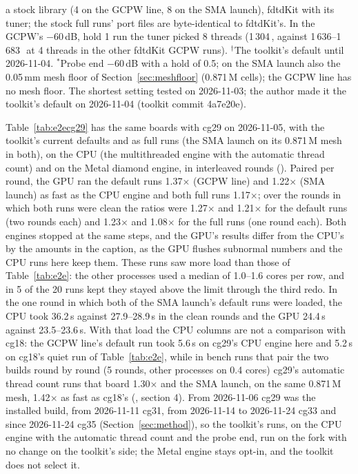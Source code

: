 \begin{table}[H]
{a stock library (4 on the GCPW line, 8 on the SMA launch), fdtdKit with its tuner; the stock full runs' port files are
byte-identical to fdtdKit's. In the GCPW's $-60$\,dB, hold 1 run the tuner picked 8 threads (1\,304\,\MC, against
1\,636--1\,683\,\MC\ at 4 threads in the other fdtdKit GCPW runs). $^{\dagger}$The toolkit's default until
2026-11-04. $^{*}$Probe end $-60$\,dB with a hold of
0.5; on the SMA launch also the 0.05\,mm mesh floor of Section~\ref{sec:meshfloor} (0.871\,M cells); the GCPW line
has no mesh floor. The shortest setting tested on 2026-11-03; the author made it the toolkit's default on 2026-11-04
(toolkit commit 4a7e20e).}\label{tab:e2e}
\end{table}

Table~\ref{tab:e2ecg29} has the same boards with cg29 on 2026-11-05, with the toolkit's current defaults and as full
runs (the SMA launch on its 0.871\,M mesh in both), on the CPU (the multithreaded engine with the automatic thread
count) and on the Metal diamond engine, in interleaved rounds ().
Paired per round, the GPU ran the default runs
1.37$\times$ (GCPW line) and 1.22$\times$ (SMA launch) as fast as the CPU engine and both full runs 1.17$\times$; over
the rounds in which both runs were clean the ratios were 1.27$\times$ and 1.21$\times$ for the default runs (two
rounds each) and 1.23$\times$ and 1.08$\times$ for the full runs (one round each). Both engines stopped at the same
steps, and the GPU's results differ from the CPU's by the amounts in the caption, as the GPU flushes subnormal
numbers and the CPU runs here keep them. These runs saw more load than those of Table~\ref{tab:e2e}: the other
processes used a median of 1.0--1.6 cores per row, and in 5 of the 20 runs kept they stayed above the limit through
the third redo. In the one round in which both of the SMA launch's default runs were loaded, the CPU took 36.2\,s
against 27.9--28.9\,s in the clean rounds and the GPU 24.4\,s against 23.5--23.6\,s. With that load the CPU
columns are not a comparison with cg18: the GCPW line's default run took 5.6\,s on cg29's CPU engine here and 5.2\,s
on cg18's quiet run of Table~\ref{tab:e2e}, while in bench runs that pair the two builds round by round (5 rounds,
other processes on 0.4 cores) cg29's automatic thread count runs that board 1.30$\times$ and the SMA launch, on the
same 0.871\,M mesh, 1.42$\times$ as fast as cg18's (, section 4).
From 2026-11-06 cg29 was the installed build, from 2026-11-11 cg31, from 2026-11-14 to 2026-11-24 cg33 and since 2026-11-24 cg35 (Section~\ref{sec:method}), so the
toolkit's runs, on the CPU engine with
the automatic thread count and the probe end, run on the fork with no change on the toolkit's side; the Metal
engine stays
opt-in, and the toolkit does not select it.

